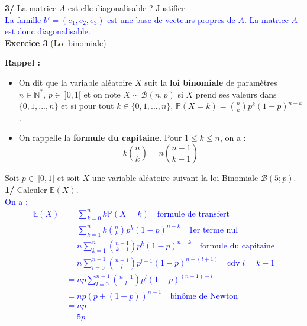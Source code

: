 \documentclass[a4paper,12pt]{article}
\newcommand{\E}{\mathbb{E}}
\newcommand{\prob}{\mathbb{P}}
\newcommand{\n}{\mathbb{N}}
\begin{document}
\textbf{3/} La matrice $A$ est-elle diagonalisable ? Justifier. \\

\textcolor{blue}{La famille $\boxed{\underline{b}'=(e_1,e_2,e_3)}$ est une base de vecteurs propres de $A$. La matrice $A$ est donc diagonalisable.} \\

\textbf{Exercice 3} (Loi binomiale) \\

\begin{tcolorbox}[colframe=black, colback=white, sharp corners, width=\textwidth, boxrule=0.5mm]
\textbf{Rappel :}\\
\begin{itemize}
    \item On dit que la variable aléatoire $X$ suit la \textbf{loi binomiale} de paramètres $n \in \n^*$, $p \in \ ]0,1[$ et on note $X \sim \mathcal{B} (n,p)$ si $X$ prend ses valeurs dans $\{0,1,...,n\}$ et si pour tout $k \in \{0,1,...,n\}$, $\prob (X=k) = \binom{n}{k} p^k (1-p)^{n-k}$. \\

\item On rappelle la \textbf{formule du capitaine}. Pour $1 \leq k \leq n$, on a :
$$k \binom{n}{k} = n \binom{n-1}{k-1}$$
\end{itemize}
\end{tcolorbox}

Soit $p \in \ ]0,1[$ et soit $X$ une variable aléatoire suivant la loi Binomiale $\mathcal{B} (5; p)$. \\

\textbf{1/} Calculer $\E (X)$. \\
\textcolor{blue}{
On a :
\begin{align*}
\E(X) &=  \sum_{k=0}^n k \prob (X=k) \quad \text{formule de transfert} \\
&= \sum_{k=1}^n k \binom{n}{k} p^k (1-p)^{n-k} \quad \text{1er terme nul} \\
&= n \sum_{k=1}^n \binom{n-1}{k-1} p^k (1-p)^{n-k} \quad \text{formule du capitaine}  \\
&= n \sum_{l=0}^{n-1} \binom{n-1}{l} p^{l+1} (1-p)^{n-(l+1)} \quad \text{cdv } l=k-1 \\
&= np \sum_{l=0}^{n-1} \binom{n-1}{l} p^l (1-p)^{(n-1)-l} \\
&= np \left( p + (1-p) \right)^{n-1} \quad \text{binôme de Newton} \\
&= np \\
& = 5p
\end{align*}
}
\end{document}
